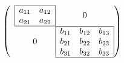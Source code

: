 \documentclass{book}
\begin{document}
\begin{equation*}
\left(
\begin{array}{c@{}c@{}}
\begin{array}{|cc|}\hline
a_{11} & a_{12} \\
a_{21} & a_{22} \\\hline
\end{array} & 0  \\
0 & \begin{array}{|ccc|}\hline
b_{11} & b_{12} & b_{13}\\
b_{21} & b_{22} & b_{23}\\
b_{31} & b_{32} & b_{33}\\\hline
\end{array}\\
\end{array}\right)
\end{equation*}
\end{document}

